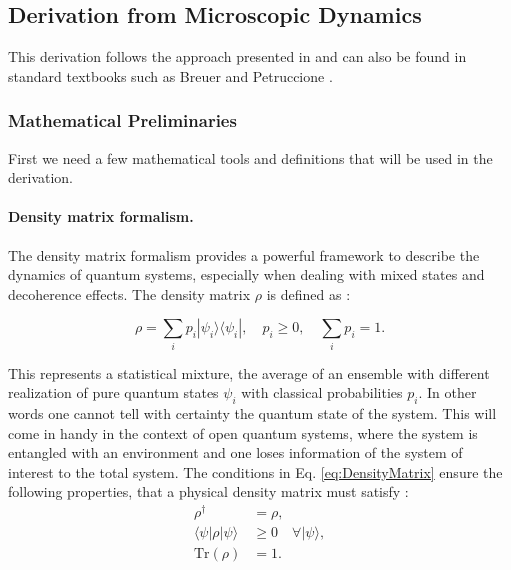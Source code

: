 \subsection{Derivation from Microscopic Dynamics}
\label{subsec:Derivation_redfield_eq}

\noindent
This derivation follows the approach presented in \cite{manzano2020shortintroductionlindblad} and can also be found in standard textbooks such as Breuer and Petruccione \cite{breuerpetruccione2009theoryopenquantum}. 

\subsubsection{Mathematical Preliminaries}
\label{subsubsec:preliminaries_tools}

\noindent
First we need a few mathematical tools and definitions that will be used in the derivation.


\paragraph{Density matrix formalism.}

The density matrix formalism provides a powerful framework to describe the dynamics of quantum systems, especially when dealing with mixed states and decoherence effects.
The density matrix \(\rho\) is defined as \cite{campaiolietal2024quantummasterequations}:

\begin{equation}
	\rho = \sum_i p_i |\psi_i\rangle \langle \psi_i|, \quad p_i \geq 0, \quad \sum_i p_i = 1.
	\label{eq:DensityMatrix}
\end{equation}


\noindent
This represents a statistical mixture, the average of an ensemble with different realization of pure quantum states $\psi_i $ with classical probabilities $ p_i $. In other words one cannot tell with certainty the quantum state of the system. This will come in handy in the context of open quantum systems, where the system is entangled with an environment and one loses information of the system of interest to the total system.
The conditions in Eq. \eqref{eq:DensityMatrix} ensure the following properties, that a physical density matrix must satisfy :
\begin{align}
	\rho^\dagger &= \rho, \tag{57a} \\
	\langle \psi | \rho | \psi \rangle &\geq 0 \quad \forall |\psi\rangle, \tag{57b} \\
	\mathrm{Tr}(\rho) &= 1. \tag{57c}
\end{align}

